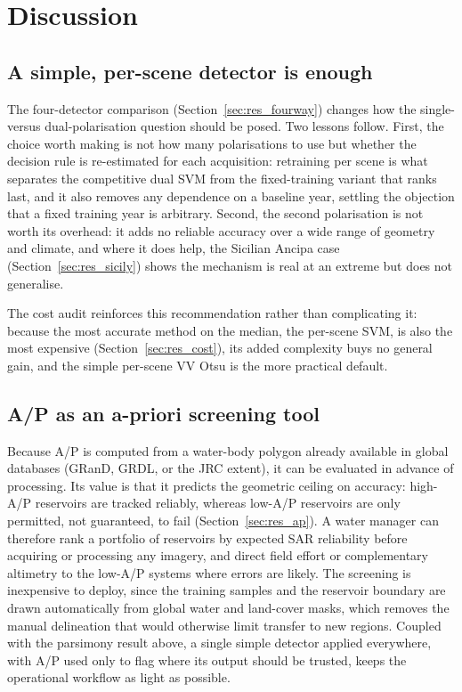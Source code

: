 \section{Discussion}
\label{sec:discussion}

\subsection{A simple, per-scene detector is enough}

The four-detector comparison (Section~\ref{sec:res_fourway}) changes how
the single- versus dual-polarisation question should be posed. Two lessons
follow. First, the choice worth making is not how many polarisations to
use but whether the decision rule is re-estimated for each acquisition:
retraining per scene is what separates the competitive dual SVM from the
fixed-training variant that ranks last, and it also removes any dependence
on a baseline year, settling the objection that a fixed training year is
arbitrary. Second, the second polarisation is not worth its overhead: it
adds no reliable accuracy over a wide range of geometry and climate, and
where it does help, the Sicilian Ancipa case (Section~\ref{sec:res_sicily})
shows the mechanism is real at an extreme but does not generalise.

The cost audit reinforces this recommendation rather than complicating it:
because the most accurate method on the median, the per-scene SVM, is also
the most expensive (Section~\ref{sec:res_cost}), its added complexity buys
no general gain, and the simple per-scene VV Otsu is the more practical
default.

\subsection{A/P as an a-priori screening tool}

Because A/P is computed from a water-body polygon already available in global
databases (GRanD, GRDL, or the JRC extent), it can be evaluated in advance of
processing. Its value is that it predicts the geometric ceiling on accuracy:
high-A/P reservoirs are tracked reliably, whereas low-A/P reservoirs are only
permitted, not guaranteed, to fail (Section~\ref{sec:res_ap}). A water manager
can therefore rank a portfolio of reservoirs by expected SAR reliability before
acquiring or processing any imagery, and direct field effort or complementary
altimetry to the low-A/P systems where errors are likely. The screening is
inexpensive to deploy, since the training samples and the reservoir boundary are
drawn automatically from global water and land-cover masks, which removes the
manual delineation that would otherwise limit transfer to new regions. Coupled
with the parsimony result above, a single simple detector applied everywhere,
with A/P used only to flag where its output should be trusted, keeps the
operational workflow as light as possible.

